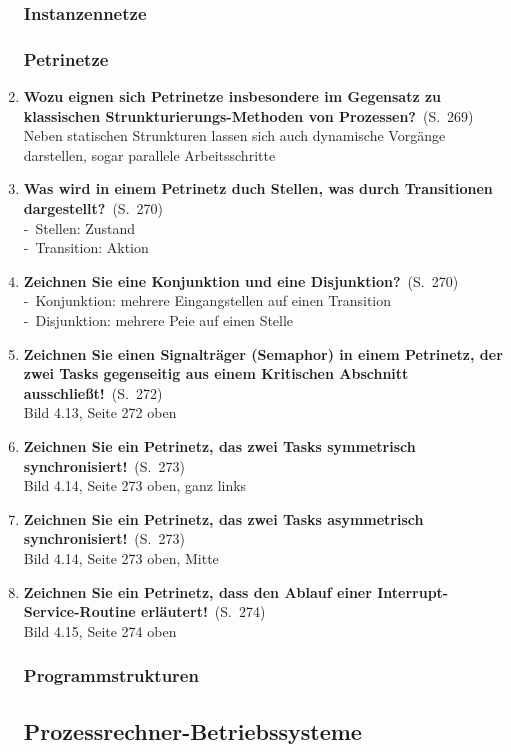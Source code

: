 \documentclass[a4paper,12pt]{article}
\newcommand{\question}[3]{\pagebreak[3]\item {\textbf{#1?}}\ (S.\ #2)#3}
\newcommand{\statement}[3]{\pagebreak[3]\item {\textbf{#1!}}\ (S.\ #2)#3}
\newcommand{\catchword}[1]{\\-\ #1}
\newcommand{\normaltext}[1]{\\#1}
\newcommand{\page}[1]{#1}
\begin{document}
\begin{enumerate}
  \subsubsection{Instanzennetze}

  \subsubsection{Petrinetze}

  \question{Wozu eignen sich Petrinetze insbesondere im Gegensatz zu 
            klassischen Strunkturierungs-Methoden von Prozessen}{\page{269}}
  {
    \normaltext{Neben statischen Strunkturen lassen sich auch dynamische
                Vorgänge darstellen, sogar parallele Arbeitsschritte}
  }

  \question{Was wird in einem Petrinetz duch Stellen, was durch Transitionen
            dargestellt}{\page{270}}
  {
    \catchword{Stellen: Zustand}
    \catchword{Transition: Aktion}
  }

  \question{Zeichnen Sie eine Konjunktion und eine Disjunktion}{\page{270}}
  {
    \catchword{Konjunktion: mehrere Eingangstellen auf einen Transition}
    \catchword{Disjunktion: mehrere Peie auf einen Stelle}
  }

  \statement{Zeichnen Sie einen Signalträger (Semaphor) in einem Petrinetz,
             der zwei Tasks gegenseitig aus einem Kritischen Abschnitt ausschließt}{\page{272}}
  {
    \normaltext{Bild 4.13, Seite 272 oben}
  }

  \statement{Zeichnen Sie ein Petrinetz, das zwei Tasks symmetrisch 
             synchronisiert}{\page{273}}
  {
    \normaltext{Bild 4.14, Seite 273 oben, ganz links}
  }

  \statement{Zeichnen Sie ein Petrinetz, das zwei Tasks asymmetrisch 
             synchronisiert}{\page{273}}
  {
    \normaltext{Bild 4.14, Seite 273 oben, Mitte}
  }

  \statement{Zeichnen Sie ein Petrinetz, dass den Ablauf einer
             Interrupt-Service-Routine erläutert}{\page{274}}
  {
    \normaltext{Bild 4.15, Seite 274 oben}
  }

  \subsubsection{Programmstrukturen}

  \subsection{Prozessrechner-Betriebssysteme}


\end{enumerate}
\end{document}
